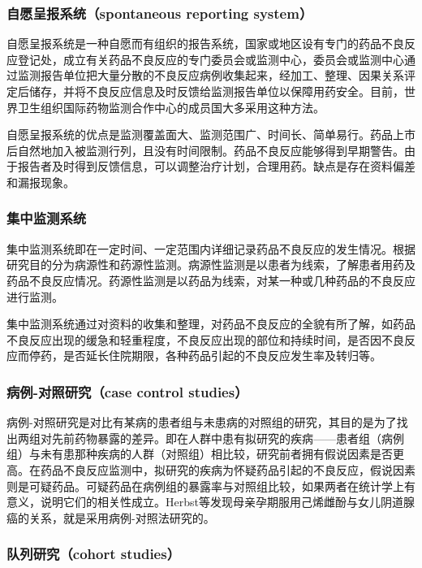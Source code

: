 \subsubsection{自愿呈报系统（spontaneous reporting system）}

自愿呈报系统是一种自愿而有组织的报告系统，国家或地区设有专门的药品不良反应登记处，成立有关药品不良反应的专门委员会或监测中心，委员会或监测中心通过监测报告单位把大量分散的不良反应病例收集起来，经加工、整理、因果关系评定后储存，并将不良反应信息及时反馈给监测报告单位以保障用药安全。目前，世界卫生组织国际药物监测合作中心的成员国大多采用这种方法。

自愿呈报系统的优点是监测覆盖面大、监测范围广、时间长、简单易行。药品上市后自然地加入被监测行列，且没有时间限制。药品不良反应能够得到早期警告。由于报告者及时得到反馈信息，可以调整治疗计划，合理用药。缺点是存在资料偏差和漏报现象。

\subsubsection{集中监测系统}

集中监测系统即在一定时间、一定范围内详细记录药品不良反应的发生情况。根据研究目的分为病源性和药源性监测。病源性监测是以患者为线索，了解患者用药及药品不良反应情况。药源性监测是以药品为线索，对某一种或几种药品的不良反应进行监测。

集中监测系统通过对资料的收集和整理，对药品不良反应的全貌有所了解，如药品不良反应出现的缓急和轻重程度，不良反应出现的部位和持续时间，是否因不良反应而停药，是否延长住院期限，各种药品引起的不良反应发生率及转归等。

\subsubsection{病例-对照研究（case control studies）}

病例-对照研究是对比有某病的患者组与未患病的对照组的研究，其目的是为了找出两组对先前药物暴露的差异。即在人群中患有拟研究的疾病------患者组（病例组）与未有患那种疾病的人群（对照组）相比较，研究前者拥有假说因素是否更高。在药品不良反应监测中，拟研究的疾病为怀疑药品引起的不良反应，假说因素则是可疑药品。可疑药品在病例组的暴露率与对照组比较，如果两者在统计学上有意义，说明它们的相关性成立。Herbst等发现母亲孕期服用己烯雌酚与女儿阴道腺癌的关系，就是采用病例-对照法研究的。

\subsubsection{队列研究（cohort studies）}

